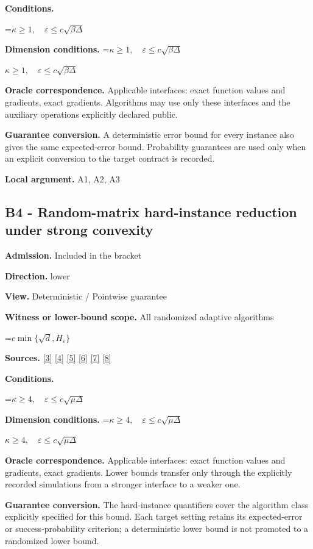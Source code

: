 \documentclass[10pt,a4paper]{article}
\newcommand{\AtlasMath}[1]{\par\begingroup\centering\setbox0=\hbox{$\displaystyle #1$}\ifdim\wd0>1.4\linewidth\typeout{ATLAS WIDE FORMULA: \the\wd0}\fi\ifdim\wd0>\linewidth\resizebox{\linewidth}{!}{\box0}\else\box0\fi\par\endgroup}
\newcommand{\AtlasInlineMath}[1]{\begingroup\setbox0=\hbox{$#1$}\ifdim\wd0>.4\linewidth\endgroup\AtlasMath{#1}\else\endgroup$#1$\fi}
\begin{document}
\textbf{Conditions.} 
\AtlasMath{\kappa\ge1,\quad\varepsilon\le c\sqrt{\beta\Delta}}


\textbf{Dimension conditions.} \AtlasInlineMath{\kappa\ge1,\quad\varepsilon\le c\sqrt{\beta\Delta}}

\textbf{Oracle correspondence.} Applicable interfaces: exact function values and gradients, exact gradients. Algorithms may use only these interfaces and the auxiliary operations explicitly declared public.

\textbf{Guarantee conversion.} A deterministic error bound for every instance also gives the same expected-error bound. Probability guarantees are used only when an explicit conversion to the target contract is recorded.

\textbf{Local argument.} A1, A2, A3

\subsection{B4 - Random-matrix hard-instance reduction under strong convexity}
\textbf{Admission.} Included in the bracket

\textbf{Direction.} lower

\textbf{View.} Deterministic / Pointwise guarantee

\textbf{Witness or lower-bound scope.} All randomized adaptive algorithms

\AtlasMath{c\min\{\sqrt d,H_\varepsilon\}}
\textbf{Sources.} \href{https://arxiv.org/pdf/2609.10874}{[3]} \href{https://arxiv.org/pdf/2101.09740v2}{[4]} \href{https://arxiv.org/pdf/2609.33360v2}{[5]} \href{https://arxiv.org/pdf/1405.4980}{[6]} \href{https://www2.isye.gatech.edu/~nemirovs/MOR_AccuracyCertificates.pdf}{[7]} \href{https://arxiv.org/pdf/2609.20701}{[8]}

\textbf{Conditions.} 
\AtlasMath{\kappa\ge4,\quad\varepsilon\le c\sqrt{\mu\Delta}}


\textbf{Dimension conditions.} \AtlasInlineMath{\kappa\ge4,\quad\varepsilon\le c\sqrt{\mu\Delta}}

\textbf{Oracle correspondence.} Applicable interfaces: exact function values and gradients, exact gradients. Lower bounds transfer only through the explicitly recorded simulations from a stronger interface to a weaker one.

\textbf{Guarantee conversion.} The hard-instance quantifiers cover the algorithm class explicitly specified for this bound. Each target setting retains its expected-error or success-probability criterion; a deterministic lower bound is not promoted to a randomized lower bound.
\end{document}
